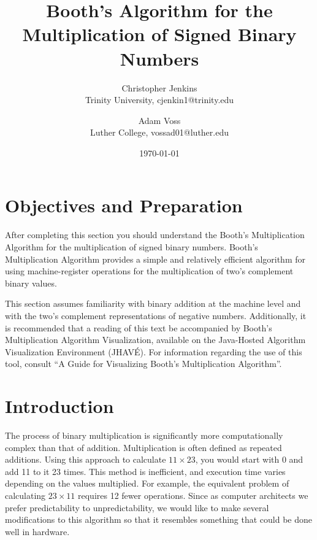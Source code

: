 \documentclass{article}
\title{Booth's Algorithm for the Multiplication of Signed Binary Numbers}
\date{\today}
\author{Christopher Jenkins\\ Trinity University, cjenkin1@trinity.edu
    \and Adam Voss\\ Luther College, vossad01@luther.edu}
\begin{document}
\maketitle
\tableofcontents

\pagebreak

\section{Objectives and Preparation}
After completing this section you should understand the Booth's Multiplication Algorithm for the multiplication of signed binary numbers.
Booth's Multiplication Algorithm provides a simple and relatively efficient algorithm for using machine-register operations for the multiplication of two's complement binary values.

This section assumes familiarity with binary addition at the machine level and with the two's complement representations of negative numbers.
Additionally, it is recommended that a reading of this text be accompanied by Booth's Multiplication Algorithm Visualization, available on the Java-Hosted Algorithm Visualization Environment (JHAVÉ).
For information regarding the use of this tool, consult ``A Guide for Visualizing Booth's Multiplication Algorithm''.

\section{Introduction}
The process of binary multiplication is significantly more computationally complex than that of addition.
Multiplication is often defined as repeated additions.
Using this approach to calculate $11 \times 23$, you would start with 0 and add 11 to it 23 times.
This method is inefficient, and execution time varies depending on the values multiplied.
For example, the equivalent problem of calculating $23 \times 11$ requires 12 fewer operations.
Since as computer architects we prefer predictability to unpredictability, we would like to make several modifications to this algorithm so that it resembles something that could be done well in hardware.

\end{document}
